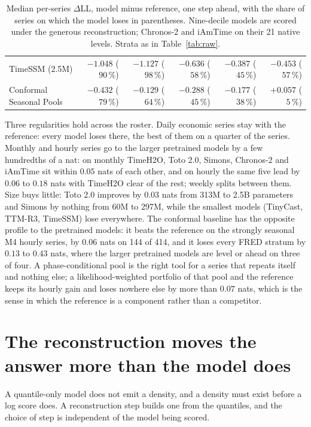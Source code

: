 \documentclass[article]{jss}
\providecommand{\proglang}[1]{\textsf{#1}}
\begin{document}
\begin{table}[t!]
\begin{tabular}{lrrrrr}
TimeSSM (2.5M) & $-1.048$ ($90\,\%$) & $-1.127$ ($98\,\%$) & $-0.636$ ($58\,\%$) & $-0.387$ ($45\,\%$) & $-0.453$ ($57\,\%$) \\
Conformal Seasonal Pools & $-0.432$ ($79\,\%$) & $-0.129$ ($64\,\%$) & $-0.288$ ($45\,\%$) & $-0.177$ ($38\,\%$) & $+0.057$ ($5\,\%$) \\
\bottomrule
\end{tabular}
\caption{Median per-series $\Delta$LL, model minus reference, one step ahead,
with the share of series on which the model loses in parentheses. Nine-decile
models are scored under the generous reconstruction; Chronos-2 and iAmTime on
their 21 native levels. Strata as in Table~\ref{tab:raw}.}
\label{tab:fmpanel}
\end{table}

Three regularities hold across the roster. Daily economic series stay with the
reference: every model loses there, the best of them on a quarter of the
series. Monthly and hourly series go to the larger pretrained models by a few
hundredths of a nat: on monthly TimeH2O, Toto 2.0, Simons, Chronos-2 and
iAmTime sit within $0.05$ nats of each other, and on hourly the same five lead
by $0.06$ to $0.18$ nats with TimeH2O clear of the rest; weekly splits between
them. Size buys little: Toto 2.0 improves by $0.03$ nats from 313M to 2.5B
parameters and Simons by nothing from 60M to 297M, while the smallest models
(TinyCast, TTM-R3, TimeSSM) lose everywhere. The conformal baseline has the
opposite profile to the pretrained models: it beats the reference on the
strongly seasonal M4 hourly series, by $0.06$ nats on 144 of 414, and it loses
every \proglang{FRED} stratum by $0.13$ to $0.43$ nats, where the larger
pretrained models are level or ahead on three of four. A phase-conditional
pool is the right tool for a series that repeats itself and nothing else; a
likelihood-weighted portfolio of that pool and the reference keeps its hourly
gain and loses nowhere else by more than $0.07$ nats, which is the sense in
which the reference is a component rather than a competitor.

\section{The reconstruction moves the answer more than the model does}\label{sec:nozzle}

A quantile-only model does not emit a density, and a density must exist before a
log score does. A reconstruction step builds one from the quantiles, and the
choice of step is independent of the model being scored.
\end{document}
